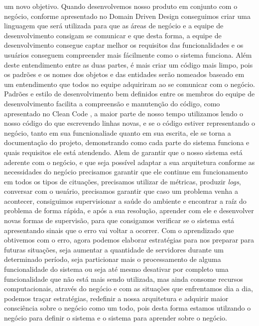     um novo objetivo. \newline
    Quando desenvolvemos nosso produto em conjunto com o negócio, conforme apresentado
    no Domain Driven Design \cite{DomainDrivenDesign} conseguimos criar uma linguagem
    que será utilizada para que as áreas de negócio e a equipe de desenvolvimento
    consigam se comunicar e que desta forma, a equipe de desenvolvimento consegue
    captar melhor os requisitos das funcionalidades e os usuários conseguem
    compreender mais fácilmente como o sistema funciona. Além deste entendimento
    entre as duas partes, é mais criar um código mais limpo, pois os padrões e os
    nomes dos objetos e das entidades serão nomeados baseado em um entendimento
    que todos no equipe adquiriram ao se comunicar com o negócio. Padrões e estilo de
    desenvolvimento bem definidos entre os membros do equipe de desenvolvimento facilita
    a compreensão e manutenção do código, como apresentado no Clean Code \cite{CleanCode},
    a maior parte de nosso tempo utilizamos lendo o nosso código do que escrevendo
    linhas novas, e se o código estiver representando o negócio, tanto em sua
    funcnionaliade quanto em sua escrita, ele se torna a documentação do projeto,
    demonstrando como cada parte do sistema funciona e quais requisitos ele está
    atendendo. \newline
    Alem de garantir que o nosso sistema está aderente com o negócio, e que seja
    possível adaptar a sua arquitetura conforme as necessidades do negócio precisamos
    garantir que ele continue em funcionamento em todos os tipos de cituações,
    precisamos utilizar de métricas, produzir \textit{logs}, conversar com o usuário,
    precisamos garantir que caso um problema venha a acontecer, consiguimos supervisionar
    a saúde do ambiente e encontrar a raíz do problema de forma rápida, e após a
    sua resolução, aprender com ele e desenvolver novas formas de supervisão, para
    que consigamos verificar se o sistema está apresentando sinais que o erro vai
    voltar a ocorrer. Com o aprendizado que obtivemos com o erro, agora podemos
    elaborar estratégias para nos preparar para futuras situações, seja aumentar
    a quantidade de servidores durante um determinado período, seja particionar
    mais o processamento de alguma funcionalidade do sistema ou seja até mesmo
    desativar por completo uma funcionalidade que não está mais sendo utilizada,
    mas ainda consome recursos computacionais, através do negócio e com as situações
    que enfrentamos dia a dia, podemos traçar estratégias, redefinir a nossa
    arquitetura e adquirir maior consciência sobre o negócio como um todo, pois
    desta forma estamos utilzando o negócio para definir o sistema e o sistema
    para aprender sobre o negócio.
